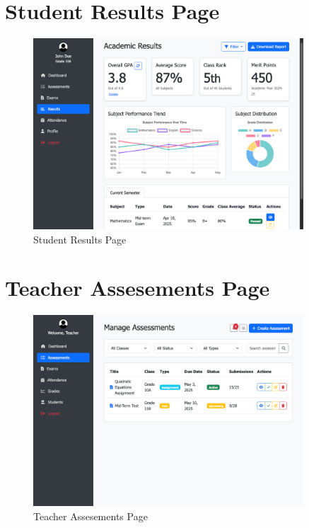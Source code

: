 \documentclass[12pt,a4paper]{report}
\begin{document}
\section{Student Results Page}
\begin{figure}[htbp]
    \centering
    \includegraphics[width=0.9\textwidth]{student-results-page.png}
    \caption{Student Results Page}
    \label{fig:student-results-page}
\end{figure}

\section{Teacher Assesements Page}
\begin{figure}[htbp]
    \centering
    \includegraphics[width=0.9\textwidth]{teacher-assessments-page.png}
    \caption{Teacher Assesements Page}
    \label{fig:teacher-assessments-page}
\end{figure}
\end{document}
